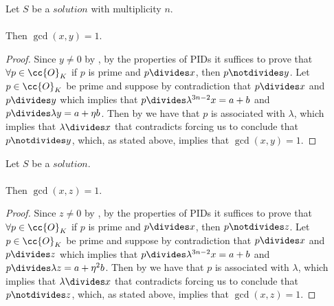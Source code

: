\begin{lemma}
  \label{lmm:coprime_x_y}
  \leanok
  Let $S$ be a $solution$ with multiplicity $n$.\\\\
  Then $\gcd(x,y) = 1$.
\end{lemma}
\begin{proof}
  \leanok
  Since $y \neq 0$ by , by the properties of PIDs it suffices to prove that
  $\forall p \in \cc{O}_K$ if $p$ is prime and $p \divides x$, then $p \notdivides y$.
  Let $p \in \cc{O}_K$ be prime and suppose by contradiction that $p \divides x$ and $p \divides y$
  which implies that $p \divides \lambda^{3n-2} x = a+b$ and $p \divides \lambda y = a + \eta b$.
  Then by 
  we have that $p$ is associated with $\lambda$, which implies that $\lambda \divides x$
  that contradicts  forcing us to conclude that $p \notdivides y$, which,
  as stated above, implies that $\gcd(x,y)=1$.
\end{proof}

\begin{lemma}
  \label{lmm:coprime_x_z}
  \leanok
  Let $S$ be a $solution$.\\\\
  Then $\gcd(x,z) = 1$.
\end{lemma}
\begin{proof}
  \leanok
  Since $z \neq 0$ by , by the properties of PIDs it suffices to prove that
  $\forall p \in \cc{O}_K$ if $p$ is prime and $p \divides x$, then $p \notdivides z$.
  Let $p \in \cc{O}_K$ be prime and suppose by contradiction that $p \divides x$ and $p \divides z$
  which implies that $p \divides \lambda^{3n-2} x = a+b$ and $p \divides \lambda z = a + \eta^2 b$.
  Then by 
  we have that $p$ is associated with $\lambda$, which implies that $\lambda \divides x$
  that contradicts  forcing us to conclude that $p \notdivides z$, which,
  as stated above, implies that $\gcd(x,z)=1$.
\end{proof}

